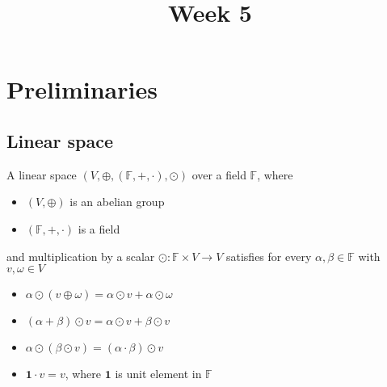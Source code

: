 \documentclass{article}
\title{Week 5}
\begin{document}
\maketitle

\section{Preliminaries}\label{vector space defs}

\subsection{Linear space}

\begin{definition}\rm\nextline
	A linear space $(V,\oplus,(\mathbb{F},+,\cdot),\odot)$ over a field $\mathbb{F}$, where
	\begin{itemize}
		\item $(V,\oplus)$ is an abelian group
		\item $(\mathbb{F},+,\cdot)$ is a field
	\end{itemize}
	and multiplication by a scalar $\odot:\mathbb{F}\times V\xrightarrow{}V$ satisfies for every $\alpha,\beta\in\mathbb{F}$ with $v,\omega\in V$
	\begin{itemize}
		\item $\alpha\odot(v\oplus\omega)=\alpha\odot v+\alpha\odot\omega$
		\item $(\alpha+\beta)\odot v=\alpha\odot v+\beta\odot v$
		\item $\alpha\odot(\beta\odot v)=(\alpha\cdot\beta)\odot v$
		\item $\mathbf{1}\cdot v=v$, where $\mathbf{1}$ is unit element in $\mathbb{F}$
	\end{itemize}
\end{definition}
\end{document}

